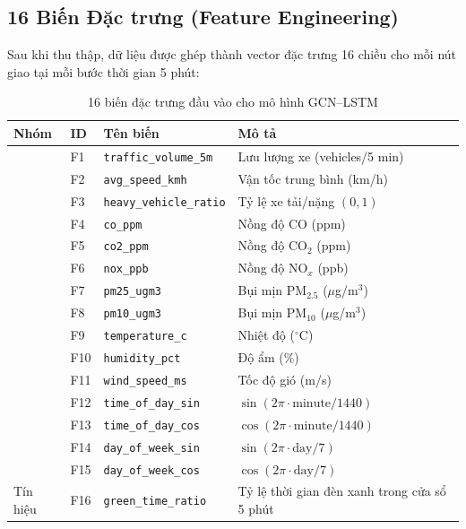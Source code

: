 \subsection{16 Biến Đặc trưng (Feature Engineering)}
Sau khi thu thập, dữ liệu được ghép thành vector đặc trưng 16 chiều cho mỗi nút giao tại mỗi bước thời gian 5 phút:
\begin{table}[H]
\centering
\caption{16 biến đặc trưng đầu vào cho mô hình GCN–LSTM}
\label{tab:features}
\renewcommand{\arraystretch}{1.4}
\begin{tabular}{>{\centering}p{1.5cm} >{\centering}p{0.8cm} p{3.5cm} p{5cm}}
\toprule
\textbf{Nhóm} & \textbf{ID} & \textbf{Tên biến} & \textbf{Mô tả} \\
\midrule
\multirow{3}{*}{Giao thông} & F1 & \texttt{traffic\_volume\_5m} & Lưu lượng xe (vehicles/5 min) \\
  & F2 & \texttt{avg\_speed\_kmh} & Vận tốc trung bình (km/h) \\
  & F3 & \texttt{heavy\_vehicle\_ratio} & Tỷ lệ xe tải/nặng $(0, 1)$ \\
\midrule
\rowcolor{rowgray}
\multirow{5}{*}{Khí thải} & F4 & \texttt{co\_ppm} & Nồng độ CO (ppm) \\
\rowcolor{rowgray}
  & F5 & \texttt{co2\_ppm} & Nồng độ CO$_2$ (ppm) \\
\rowcolor{rowgray}
  & F6 & \texttt{nox\_ppb} & Nồng độ NO$_x$ (ppb) \\
\rowcolor{rowgray}
  & F7 & \texttt{pm25\_ugm3} & Bụi mịn PM$_{2.5}$ ($\mu$g/m$^3$) \\
\rowcolor{rowgray}
  & F8 & \texttt{pm10\_ugm3} & Bụi mịn PM$_{10}$ ($\mu$g/m$^3$) \\
\midrule
\multirow{3}{*}{Khí tượng} & F9 & \texttt{temperature\_c} & Nhiệt độ ($^\circ$C) \\
  & F10 & \texttt{humidity\_pct} & Độ ẩm (\%) \\
  & F11 & \texttt{wind\_speed\_ms} & Tốc độ gió (m/s) \\
\midrule
\rowcolor{rowgray}
\multirow{5}{*}{Thời gian} & F12 & \texttt{time\_of\_day\_sin} & $\sin(2\pi \cdot \text{minute}/1440)$ \\
  & F13 & \texttt{time\_of\_day\_cos} & $\cos(2\pi \cdot \text{minute}/1440)$ \\
  & F14 & \texttt{day\_of\_week\_sin} & $\sin(2\pi \cdot \text{day}/7)$ \\
  & F15 & \texttt{day\_of\_week\_cos} & $\cos(2\pi \cdot \text{day}/7)$ \\
\midrule
\rowcolor{rowgray}
Tín hiệu & F16 & \texttt{green\_time\_ratio} & Tỷ lệ thời gian đèn xanh trong cửa sổ 5 phút \\
\bottomrule
\end{tabular}
\end{table}
